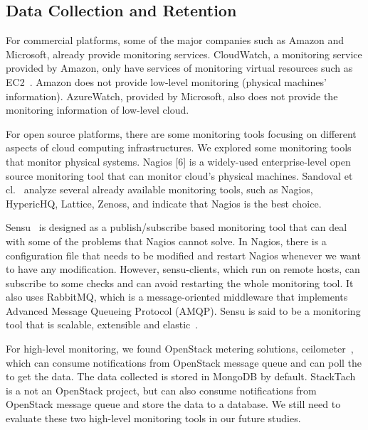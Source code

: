\subsection{Data Collection and Retention}

For commercial platforms, some of the major companies such as Amazon and Microsoft, already provide monitoring services. CloudWatch, a monitoring service provided by Amazon, only have services of monitoring virtual resources such as EC2~\cite{Aceto2013}. Amazon does not provide low-level monitoring (physical machines' information). AzureWatch, provided by Microsoft, also does not provide the monitoring information of low-level cloud. 

For open source platforms, there are some monitoring tools focusing on different aspects of cloud computing infrastructures. We explored some monitoring tools that monitor physical systems. Nagios [6] is a widely-used enterprise-level open source monitoring tool that can monitor cloud's physical machines. Sandoval et cl.~\cite{sandoval2012evaluation} analyze several already available monitoring tools, such as Nagios, HypericHQ, Lattice, Zenoss, and indicate that Nagios is the best choice. 

Sensu~\cite{sensu} is designed as a publish/subscribe based monitoring tool that can deal with some of the problems that Nagios cannot solve. In Nagios, there is a configuration file that needs to be modified and restart Nagios whenever we want to have any modification. However, sensu-clients, which run on remote hosts, can subscribe to some checks and can avoid restarting the whole monitoring tool. It also uses RabbitMQ, which is a message-oriented middleware that implements Advanced Message Queueing Protocol (AMQP). Sensu is said to be a monitoring tool that is scalable, extensible and elastic~\cite{Aceto2013}. 

For high-level monitoring, we found OpenStack metering solutions, ceilometer~\cite{ceilometer}, which can consume notifications from OpenStack message queue and can poll the to get the data. The data collected is stored in MongoDB by default. StackTach~\cite{stacktach} is a not an OpenStack project, but can also consume notifications from  OpenStack message queue and store the data to a database. We still need to evaluate these two high-level monitoring tools in our future studies.